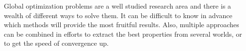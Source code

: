 Global optimization problems are a well studied research area and there is a
wealth of different ways to solve them. It can be difficult to know in advance
which methods will provide the most fruitful results. Also, multiple approaches
can be combined in efforts to extract the best properties from several worlds,
or to get the speed of convergence up.

